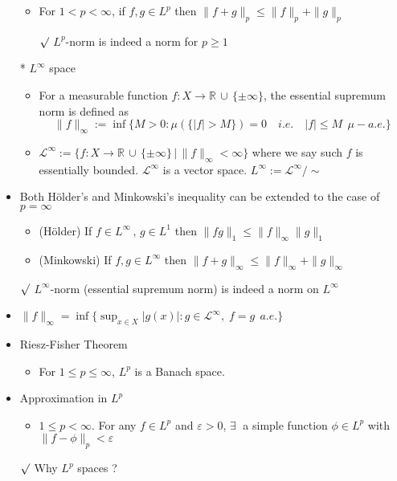 \documentclass[12pt]{article}
\newcommand{\rmk}{$\surd$}
\newcommand{\R}{\mathbb{R}}
\newcommand{\LL}{\mathcal{L}}
\newcommand{\exist}{\exists \;}
\newcommand{\union}{\,\cup\,}
\begin{document}
\begin{itemize}
\begin{itemize}
        \item For $1<p<\infty$, if $f,g\in L^p$ then $\|f+g\|_p\leq \|f\|_p+\|g\|_p$
        \item[\rmk] $L^p$-norm is indeed a norm for $p\geq 1$
    \end{itemize}
    \item[*]$L^\infty$ space
    \begin{itemize}
        \item For a measurable function $f:X\rightarrow \R\union \{\pm \infty\}$, the essential supremum norm is defined as \begin{equation*} \|f\|_\infty := \inf\{M>0 : \mu(\{|f|>M\})=0 \quad i.e.\quad |f|\leq M\;\, \mu-a.e.\}
        \end{equation*}
        \item $\LL^\infty :=\{f:X \rightarrow \R\union \{\pm \infty\} \,|\, \|f\|_\infty<\infty \}$ where we say such $f$ is essentially bounded. \; $\LL^\infty$ is a vector space. \; $L^\infty:=\LL^\infty/\sim$
    \end{itemize}
    \item Both H\"older's and Minkowski's inequality can be extended to the case of $p=\infty$
    \begin{itemize}
        \item (H\"older) If $f\in L^\infty\, ,\, g\in L^1$ then $\|fg\|_1\leq \|f\|_\infty\|g\|_1$
        \item (Minkowski) If $f,g\in L^\infty$ then $\|f+g\|_\infty\leq \|f\|_\infty+\|g\|_\infty$
    \end{itemize}
    \item[\rmk] $L^\infty$-norm (essential supremum norm) is indeed a norm on $L^\infty$
    \item $\|f\|_\infty = \inf\{\sup_{x\in X}|g(x)| : g\in \LL^\infty, \; f=g\;\,a.e.\}$
    \item Riesz-Fisher Theorem
    \begin{itemize}
        \item For $1\leq p\leq \infty$, $L^p$ is a Banach space.
    \end{itemize}   
    \item Approximation in $L^p$
    \begin{itemize}
        \item $1\leq p<\infty$. For any $f\in L^p$ and $\varepsilon>0$, $\exist$ a simple function $\phi\in L^p$ with $\|f-\phi\|_p<\varepsilon$
    \end{itemize}
    \item[\rmk] Why $L^p$ spaces ?

\end{itemize}
\end{document}
